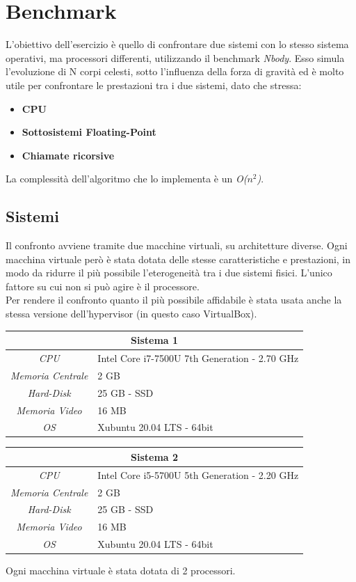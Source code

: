 \chapter{Benchmark}
L'obiettivo dell'esercizio è quello di confrontare due sistemi con lo stesso sistema operativi, ma processori differenti, utilizzando il benchmark \textit{Nbody}. Esso simula l'evoluzione di N corpi celesti, sotto l'influenza della forza di gravità ed è molto utile per confrontare le prestazioni tra i due sistemi, dato che stressa:
\begin{itemize}
	\item \textbf{CPU}
	\item \textbf{Sottosistemi Floating-Point}
	\item \textbf{Chiamate ricorsive}
\end{itemize}
La complessità dell'algoritmo che lo implementa è un \textit{O($n^2$)}.

\section{Sistemi}
Il confronto avviene tramite due macchine virtuali, su architetture diverse. Ogni macchina virtuale però è stata dotata delle stesse caratteristiche e prestazioni, in modo da ridurre il più possibile l'eterogeneità tra i due sistemi fisici. L'unico fattore su cui non si può agire è il processore. 
\\Per rendere il confronto quanto il più possibile affidabile è stata usata anche la stessa versione dell'hypervisor (in questo caso VirtualBox).
\begin{table}[H]
	\begin{center}
		\begin{tabularx}{0.49\textwidth}{|c|X|}
			\hline
			\multicolumn{2}{|c|}{\textbf{Sistema 1}} \\
			\hline
			\textit{CPU} & Intel Core i7-7500U 7th Generation - 2.70 GHz \\
			\hline
			\textit{Memoria Centrale} & 2 GB \\
			\hline
			\textit{Hard-Disk} & 25 GB - SSD \\
			\hline
			\textit{Memoria Video} & 16 MB \\
			\hline
			\textit{OS} & Xubuntu 20.04 LTS - 64bit \\
			\hline
		\end{tabularx}
		\begin{tabularx}{0.49\textwidth}{|c|X|}
			\hline
			\multicolumn{2}{|c|}{\textbf{Sistema 2}} \\
			\hline
			\textit{CPU} & Intel Core i5-5700U 5th Generation - 2.20 GHz\\
			\hline
			\textit{Memoria Centrale} & 2 GB \\
			\hline
			\textit{Hard-Disk} & 25 GB - SSD \\
			\hline
			\textit{Memoria Video} & 16 MB \\
			\hline
			\textit{OS} & Xubuntu 20.04 LTS - 64bit \\
			\hline
		\end{tabularx}
	\end{center}
\end{table}
Ogni macchina virtuale è stata dotata di 2 processori.

